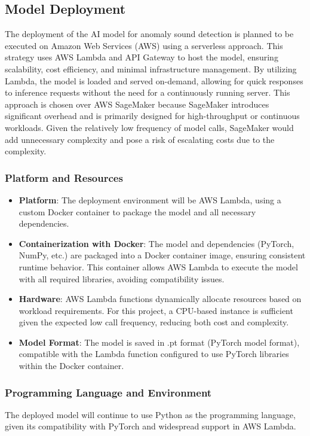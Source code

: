 \documentclass[conference]{IEEEtran}
\begin{document}
\subsection{Model Deployment}
The deployment of the AI model for anomaly sound detection is planned to be executed on Amazon Web Services (AWS) using a serverless approach. This strategy uses AWS Lambda and API Gateway to host the model, ensuring scalability, cost efficiency, and minimal infrastructure management. By utilizing Lambda, the model is loaded and served on-demand, allowing for quick responses to inference requests without the need for a continuously running server. This approach is chosen over AWS SageMaker because SageMaker introduces significant overhead and is primarily designed for high-throughput or continuous workloads. Given the relatively low frequency of model calls, SageMaker would add unnecessary complexity and pose a risk of escalating costs due to the complexity.

\subsubsection{Platform and Resources} 
\begin{itemize} 
    \item \textbf{Platform}: The deployment environment will be AWS Lambda, using a custom Docker container to package the model and all necessary dependencies.
    \item \textbf{Containerization with Docker}: The model and dependencies (PyTorch, NumPy, etc.) are packaged into a Docker container image, ensuring consistent runtime behavior. This container allows AWS Lambda to execute the model with all required libraries, avoiding compatibility issues.
    \item \textbf{Hardware}: AWS Lambda functions dynamically allocate resources based on workload requirements. For this project, a CPU-based instance is sufficient given the expected low call frequency, reducing both cost and complexity.
    \item \textbf{Model Format}: The model is saved in .pt format (PyTorch model format), compatible with the Lambda function configured to use PyTorch libraries within the Docker container.
\end{itemize}

\subsubsection{Programming Language and Environment} 
The deployed model will continue to use Python as the programming language, given its compatibility with PyTorch and widespread support in AWS Lambda. 
\end{document}
